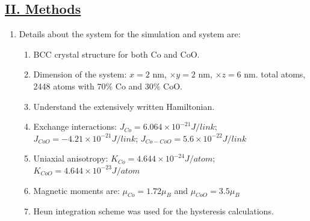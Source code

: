 \subsection*{\underline{II. Methods}}
\begin{enumerate}
    \item Details about the system for the simulation and system are:
    \begin{enumerate} [\ding{212}]
        \item BCC crystal structure for both Co and CoO.
        \item Dimension of the system: $x=2$ nm, $\times y=2$ nm, $\times z=6$ nm. total atoms, 2448 atoms with $70\%$ Co and $30\%$ CoO.
        \item Understand the extensively written Hamiltonian.
        \item Exchange interactions: {$J_{Co}=6.064\times10^{-21}J/link$}; \\{$J_{CoO}=-4.21\times10^{-21}J/link$}; {$J_{Co-CoO}=5.6\times10^{-22}J/link$}
        \item Uniaxial anisotropy: {$K_{Co}=4.644\times10^{-24}J/atom$}; \\{$K_{CoO}=4.644\times10^{-23}J/atom$}
        \item Magnetic moments are: $\mu_{Co}=1.72\mu_B$ and $\mu_{CoO}=3.5\mu_B$ 
        \item Heun integration scheme was used for the hysteresis calculations.

\end{enumerate}
\end{enumerate}
